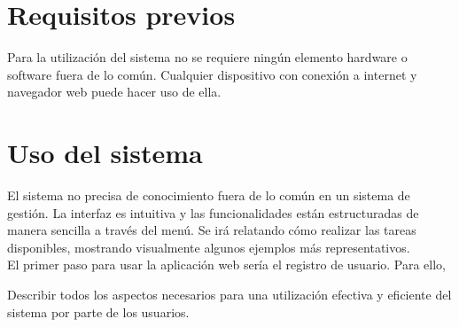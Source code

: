 \section{Requisitos previos}

Para la utilización del sistema no se requiere ningún elemento hardware o software fuera de lo común. Cualquier dispositivo con conexión a internet y navegador web puede hacer uso de ella. 


\section{Uso del sistema}

El sistema no precisa de conocimiento fuera de lo común en un sistema de gestión. La interfaz es intuitiva y las funcionalidades están estructuradas de manera sencilla a través del menú. Se irá relatando cómo realizar las tareas disponibles, mostrando visualmente algunos ejemplos más representativos. \\

El primer paso para usar la aplicación web sería el registro de usuario. Para ello, 










Describir todos los aspectos necesarios para una utilización efectiva y eficiente del sistema por parte de los usuarios.



